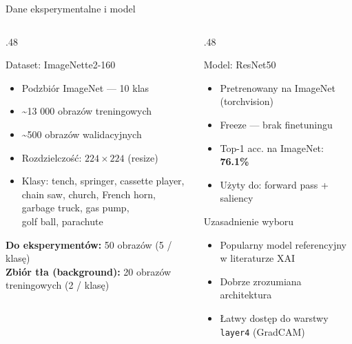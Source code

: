 \documentclass[aspectratio=169, 12pt]{beamer}
\begin{document}
\begin{frame}{Dane eksperymentalne i model}
  \begin{columns}[T]
    \begin{column}{.48\textwidth}
      \begin{block}{Dataset: ImageNette2-160}
        \begin{itemize}
          \item Podzbiór ImageNet — 10 klas
          \item \textasciitilde 13 000 obrazów treningowych
          \item \textasciitilde 500 obrazów walidacyjnych
          \item Rozdzielczość: $224\times224$ (resize)
          \item Klasy: tench, springer, cassette player,\\
                chain saw, church, French horn,\\
                garbage truck, gas pump,\\
                golf ball, parachute
        \end{itemize}
      \end{block}
      \vspace{4pt}
      \textbf{Do eksperymentów:} 50 obrazów (5 / klasę)\\
      \textbf{Zbiór tła (background):} 20 obrazów treningowych (2 / klasę)
    \end{column}
    \begin{column}{.48\textwidth}
      \begin{block}{Model: ResNet50}
        \begin{itemize}
          \item Pretrenowany na ImageNet (torchvision)
          \item Freeze — brak finetuningu
          \item Top-1 acc. na ImageNet: \textbf{76.1\%}
          \item Użyty do: forward pass + saliency
        \end{itemize}
      \end{block}
      \vspace{6pt}
      \begin{block}{Uzasadnienie wyboru}
        \begin{itemize}
          \item Popularny model referencyjny w literaturze XAI
          \item Dobrze zrozumiana architektura
          \item Łatwy dostęp do warstwy \texttt{layer4} (GradCAM)
        \end{itemize}
      \end{block}
    \end{column}
  \end{columns}
\end{frame}
\end{document}
